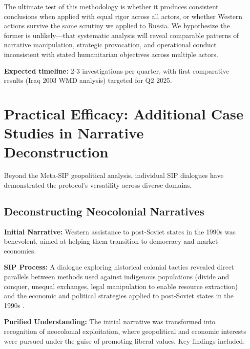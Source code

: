 \documentclass[11pt,a4paper]{article}
\begin{document}
\begin{small}
The ultimate test of this methodology is whether it produces consistent 
conclusions when applied with equal rigor across all actors, or whether 
Western actions survive the same scrutiny we applied to Russia. We 
hypothesize the former is unlikely—that systematic analysis will reveal 
comparable patterns of narrative manipulation, strategic provocation, 
and operational conduct inconsistent with stated humanitarian objectives 
across multiple actors.

\textbf{Expected timeline:} 2-3 investigations per quarter, with first 
comparative results (Iraq 2003 WMD analysis) targeted for Q2 2025.

\section{Practical Efficacy: Additional Case Studies in Narrative Deconstruction}

Beyond the Meta-SIP geopolitical analysis, individual SIP dialogues have demonstrated the protocol's versatility across diverse domains.

\subsection{Deconstructing Neocolonial Narratives}

\textbf{Initial Narrative:} Western assistance to post-Soviet states in the 1990s was benevolent, aimed at helping them transition to democracy and market economies.

\textbf{SIP Process:} A dialogue exploring historical colonial tactics revealed direct parallels between methods used against indigenous populations (divide and conquer, unequal exchanges, legal manipulation to enable resource extraction) and the economic and political strategies applied to post-Soviet states in the 1990s \citep{dialogue3,dialogue7}.

\textbf{Purified Understanding:} The initial narrative was transformed into recognition of neocolonial exploitation, where geopolitical and economic interests were pursued under the guise of promoting liberal values. Key findings included:


\end{small}
\end{document}

